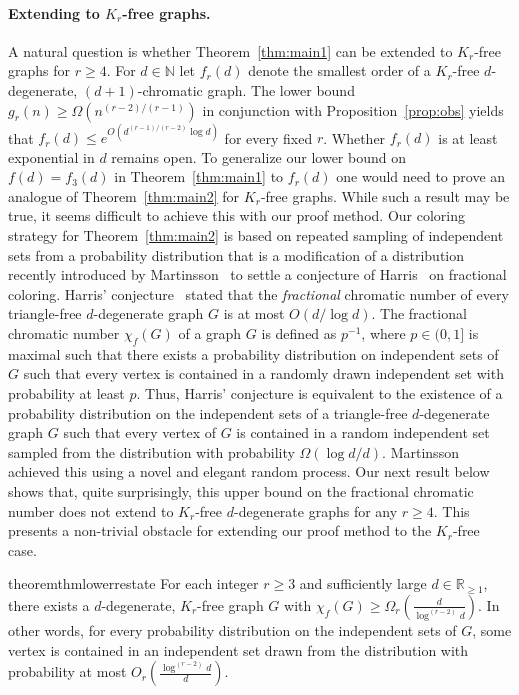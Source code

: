 \documentclass[10pt]{amsart}
\theoremstyle{definition}
\begin{document}
\paragraph*{\textbf{Extending to $K_r$-free graphs.}} A natural question is whether Theorem~\ref{thm:main1} can be extended to $K_r$-free graphs for $r\ge 4$. For $d\in \mathbb{N}$ let $f_r(d)$ denote the smallest order of a $K_r$-free $d$-degenerate, $(d+1)$-chromatic graph. The lower bound $g_r(n)\ge \Omega(n^{(r-2)/(r-1)})$ in conjunction with Proposition~\ref{prop:obs} yields that $f_r(d)\le e^{O(d^{(r-1)/(r-2)}\log d)}$ for every fixed $r$. Whether $f_r(d)$ is at least exponential in $d$ remains open. To generalize our lower bound on $f(d)=f_3(d)$ in Theorem~\ref{thm:main1} to $f_r(d)$ one would need to prove an analogue of Theorem~\ref{thm:main2} for $K_r$-free graphs. While such a result may be true, it seems difficult to achieve this with our proof method. Our coloring strategy for Theorem~\ref{thm:main2} is based on repeated sampling of independent sets from a probability distribution that is a modification of a distribution recently introduced by Martinsson~\cite{martinsson} to settle a conjecture of Harris~\cite{harris} on fractional coloring. Harris' conjecture~\cite{harris} stated that the \emph{fractional} chromatic number of every triangle-free $d$-degenerate graph $G$ is at most $O(d/\log d)$. The fractional chromatic number $\chi_f(G)$ of a graph $G$ is defined as $p^{-1}$, where $p\in (0,1]$ is maximal such that there exists a probability distribution on independent sets of $G$ such that every vertex is contained in a randomly drawn independent set with probability at least $p$.  Thus, Harris' conjecture is equivalent to the existence of a probability distribution on the independent sets of a triangle-free $d$-degenerate graph $G$ such that every vertex of $G$ is contained in a random independent set sampled from the distribution with probability $\Omega(\log d/d)$.  Martinsson~\cite{martinsson} achieved this using a novel and elegant random process. Our next result below shows that, quite surprisingly, this upper bound on the fractional chromatic number does not extend to $K_r$-free $d$-degenerate graphs for any $r\ge 4$. This presents a non-trivial obstacle for extending our proof method to the $K_r$-free case. 

\begin{restatable}{theorem}{thmlowerrestate}
    \label{thm:lower}
    For each integer $r \geq 3$ and sufficiently large $d\in \mathbb{R}_{\ge 1}$, there exists a $d$-degenerate, $K_r$-free graph $G$ with $\chi_f(G) \ge \Omega_r\left(\frac{d}{\log^{(r - 2)} d}\right)$. In other words, for every probability distribution on the independent sets of $G$, some vertex is contained in an independent set drawn from the distribution with probability at most $O_r\left(\frac{\log^{(r - 2)} d}{d}\right)$.
\end{restatable}
\end{document}
